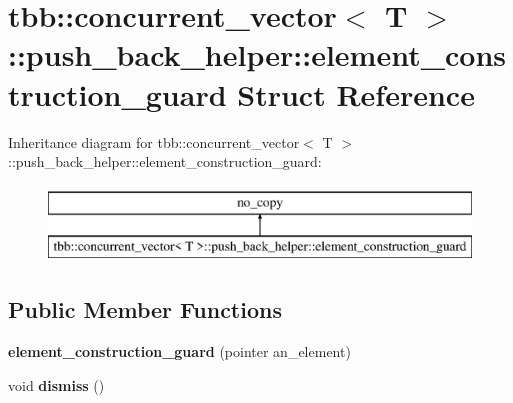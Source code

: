 \hypertarget{structtbb_1_1concurrent__vector_1_1push__back__helper_1_1element__construction__guard}{}\section{tbb\+:\+:concurrent\+\_\+vector$<$ T $>$\+:\+:push\+\_\+back\+\_\+helper\+:\+:element\+\_\+construction\+\_\+guard Struct Reference}
\label{structtbb_1_1concurrent__vector_1_1push__back__helper_1_1element__construction__guard}
Inheritance diagram for tbb\+:\+:concurrent\+\_\+vector$<$ T $>$\+:\+:push\+\_\+back\+\_\+helper\+:\+:element\+\_\+construction\+\_\+guard\+:\begin{figure}[H]
\begin{center}
\leavevmode
\includegraphics[height=2.000000cm]{structtbb_1_1concurrent__vector_1_1push__back__helper_1_1element__construction__guard}
\end{center}
\end{figure}
\subsection*{Public Member Functions}
\begin{DoxyCompactItemize}
\item 
\hypertarget{structtbb_1_1concurrent__vector_1_1push__back__helper_1_1element__construction__guard_a0cd2bb35922ec88bce64bc3879558c7a}{}{\bfseries element\+\_\+construction\+\_\+guard} (pointer an\+\_\+element)\label{structtbb_1_1concurrent__vector_1_1push__back__helper_1_1element__construction__guard_a0cd2bb35922ec88bce64bc3879558c7a}

\item 
\hypertarget{structtbb_1_1concurrent__vector_1_1push__back__helper_1_1element__construction__guard_af520a3458a5122ba1cccf58b2db66479}{}void {\bfseries dismiss} ()\label{structtbb_1_1concurrent__vector_1_1push__back__helper_1_1element__construction__guard_af520a3458a5122ba1cccf58b2db66479}

\end{DoxyCompactItemize}

